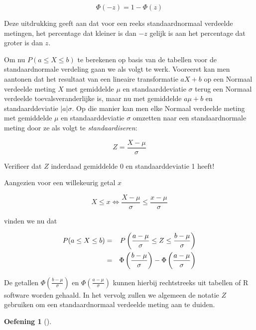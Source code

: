 \documentclass[
  dutch,
  letterpaper,
  12pt]{book}
\theoremstyle{definition}
\newtheorem{exercise}{Oefening}[chapter]
\theoremstyle{definition}
\theoremstyle{definition}
\theoremstyle{remark}
\begin{document}
\begin{equation*}
\Phi(-z)= 1- \Phi(z)
\end{equation*}

Deze uitdrukking geeft aan dat voor een reeks standaardnormaal verdeelde
metingen, het percentage dat kleiner is dan \(-z\) gelijk is aan het
percentage dat groter is dan \(z\).

Om nu \(P(a\leq X\leq b)\) te berekenen op basis van de tabellen voor de
standaardnormale verdeling gaan we als volgt te werk. Vooreerst kan men
aantonen dat het resultaat van een lineaire transformatie \(aX+b\) op
een Normaal verdeelde meting \(X\) met gemiddelde \(\mu\) en
standaarddeviatie \(\sigma\) terug een Normaal verdeelde
toevalsveranderlijke is, maar nu met gemiddelde \(a\mu+b\) en
standaarddeviatie \(|a|\sigma\). Op die manier kan men elke Normaal
verdeelde meting met gemiddelde \(\mu\) en standaarddeviatie \(\sigma\)
omzetten naar een standaardnormale meting door ze als volgt te
\emph{standaardiseren}:

\begin{equation*}
Z = \frac{X- \mu}{\sigma}
\end{equation*}

Verifieer dat \(Z\) inderdaad gemiddelde 0 en standaarddeviatie 1 heeft!

Aangezien voor een willekeurig getal \(x\)

\begin{equation*}
X\leq x \Leftrightarrow \frac{X-\mu}{\sigma} \leq \frac{x-\mu}{\sigma}
\end{equation*}

vinden we nu dat

\begin{eqnarray*}
P(a \leq X \leq b) & = & P\left(\frac{a-\mu}{\sigma} \leq Z \leq \frac{b-\mu%
}{\sigma} \right) \\
& = & \Phi \left (\frac{b-\mu}{\sigma} \right ) - \Phi \left (\frac{a-\mu}{%
\sigma} \right )
\end{eqnarray*}

De getallen \(\Phi \left (\frac{b-\mu}{\sigma} \right )\) en
\(\Phi \left (\frac{a-\mu}{\sigma} \right )\) kunnen hierbij
rechtstreeks uit tabellen of R software worden gehaald. In het vervolg
zullen we algemeen de notatie \(Z\) gebruiken om een standaardnormaal
verdeelde meting aan te duiden.

\begin{exercise}[]\protect\hypertarget{exr-02-concepten-1}{}\label{exr-02-concepten-1}

~

\end{exercise}
\end{document}
